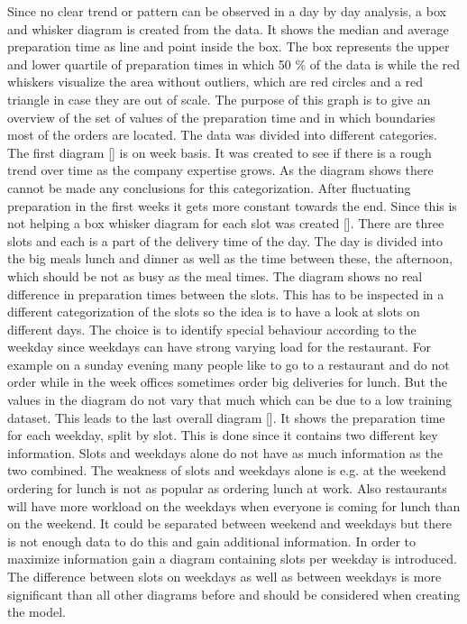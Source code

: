 Since no clear trend or pattern can be observed in a day by day analysis, a box and whisker diagram is created from the data. It shows the median and average preparation time as line and point inside the box. The box represents the upper and lower quartile of preparation times in which 50 \% of the data is while the red whiskers visualize the area without outliers, which are red circles and a red triangle in case they are out of scale. The purpose of this graph is to give an overview of the set of values of the preparation time and in which boundaries most of the orders are located. The data was divided into different categories. The first diagram [] is on week basis. It was created to see if there is a rough trend over time as the company expertise grows. As the diagram shows there cannot be made any conclusions for this categorization. After fluctuating preparation in the first weeks it gets more constant towards the end. Since this is not helping a box whisker diagram for each slot was created []. There are three slots and each is a part of the delivery time of the day. The day is divided into the big meals lunch and dinner as well as the time between these, the afternoon, which should be not as busy as the meal times. The diagram shows no real difference in preparation times between the slots. This has to be inspected in a different categorization of the slots so the idea is to have a look at slots on different days. The choice is to identify special behaviour according to the weekday since weekdays can have strong varying load for the restaurant. For example on a sunday evening many people like to go to a restaurant and do not order while in the week offices sometimes order big deliveries for lunch. But the values in the diagram do not vary that much which can be due to a low training dataset. This leads to the last overall diagram []. It shows the preparation time for each weekday, split by slot. This is done since it contains two different key information. Slots and weekdays alone do not have as much information as the two combined. The weakness of slots and weekdays alone is e.g. at the weekend ordering for lunch is not as popular as ordering lunch at work. Also restaurants will have more workload on the weekdays when everyone is coming for lunch than on the weekend. It could be separated between weekend and weekdays but there is not enough data to do this and gain additional information. In order to maximize information gain a diagram containing slots per weekday is introduced. The difference between slots on weekdays as well as between weekdays is more significant than all other diagrams before and should be considered when creating the model.

